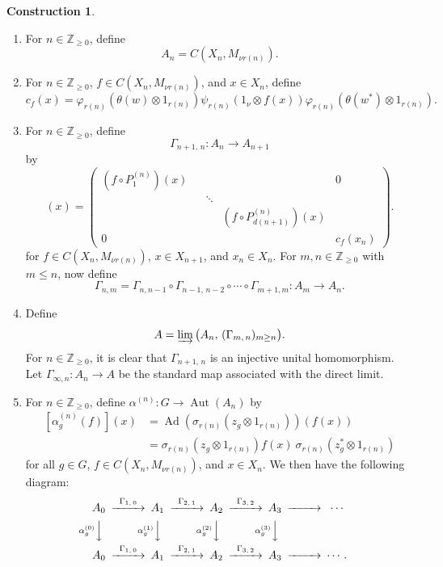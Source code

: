\documentclass[10pt]{amsart}
\numberwithin{equation}{section}
\theoremstyle{definition}
\newtheorem{ctn}[thm]{Construction}
\newcommand{\Nz}{{\mathbb{Z}}_{\geq 0}}
\newcommand{\Aut}{{\operatorname{Aut}}}
\newcommand{\Ad}{{\operatorname{Ad}}}
\newcommand{\dirlim}{\varinjlim}
\begin{document}
\begin{ctn}
\begin{enumerate}
\item\label{Ctn_9}
For $n \in \Nz$, define
\[
A_{n}
 = C \left(X_{n}, M_{\nu r (n)}\right).
\]
\item\label{Ctn_10-}
For $n \in \Nz$, $f \in  C \left(X_{n}, M_{\nu r (n)}\right)$, and $x \in X_n$, define
\[
c_f (x)
= 
\varphi_{r(n)} \left(\theta(w) \otimes 1_{r(n)} \right)
\psi_{r(n)} \left(1_{\nu} \otimes f(x)\right)
\varphi_{r(n)} \left(\theta(w^*) \otimes 1_{r(n)} \right).
\]
\item\label{Ctn_10}
For $n \in \Nz$, define
\[
\Gamma_{n + 1, \, n} \colon A_n  \to A_{n+1}
\] by
\begin{equation*}
[\Gamma_{n + 1, \, n} (f)](x) =
\left( \begin{matrix}
    \left(f \circ P^{(n)}_{1}\right) (x) & & & & 0 \\
    & &  \ddots      & &     \\
    & & & \left(f \circ P^{(n)}_{d (n + 1)} \right)(x) \\
 0  & & & &   
 c_f (x_n) 
 \end{matrix} \right).
\end{equation*}
for $f \in C \left(X_{n}, M_{\nu r(n)}\right)$, $x \in X_{n+1}$, and $x_n \in X_n$.
For $m, n \in \Nz$ with $m \leq n$,
now define
\[
\Gamma_{n, m}
= \Gamma_{n, n - 1} \circ \Gamma_{n - 1, \, n - 2} \circ \cdots
          \circ \Gamma_{m + 1, m}
   \colon A_m \to A_n.
\]
%
\item\label{Ctn_11}
Define
\[
A = \dirlim \big( A_n, \, (\Gamma_{m, \, n})_{m \geq n} \big).
\]
For $n \in \Nz$, it is clear that $\Gamma_{n + 1, \, n}$
is an injective unital homomorphism.
Let $\Gamma_{\infty, n} \colon A_n \to A$
be the standard map associated with the direct limit.
\item\label{Ctn_12}
For $n \in \Nz$, define
$\alpha^{(n)} \colon G \to \Aut (A_n)$  by
\begin{align*}
\left[\alpha^{(n)}_g (f)\right](x) 
&= 
\Ad\left(\sigma_{r(n)} (z_g\otimes 1_{r(n)})\right) (f(x))
\\&
=
\sigma_{r(n)} \left(z_g\otimes 1_{r(n)}\right) f(x) \ \sigma_{r(n)} \left(z^*_g\otimes 1_{r(n)}\right)
\end{align*}
for all $g \in G$, $f\in C (X_{n}, M_{\nu r(n)})$, and  $x \in X_n$.
We then have the following diagram:
%
\begin{equation}\label{Eq_9411_LimDiag}
\begin{CD}
A_0
@>{\Gamma_{1, \, 0}}>>
A_1
 @>{\Gamma_{2, \, 1}}>>
A_2
@>{\Gamma_{3, \, 2}}>>
A_3
@>{}>>
 \cdots   \\
@V{\alpha^{(0)}_{g}}VV  @V{\alpha^{(1)}_{g}}VV
@V{\alpha^{(2)}_{g}}VV     @V{\alpha^{(3)}_{g}}VV      \\
A_0
@>{\Gamma_{1, \, 0}}>>
A_1
@>{\Gamma_{2, \, 1}}>>
A_2
@>{\Gamma_{3, \, 2}}>>
A_3
@>{}>>
 \cdots.
\end{CD}
\end{equation}
%
\end{enumerate}
\end{ctn}
\end{document}
